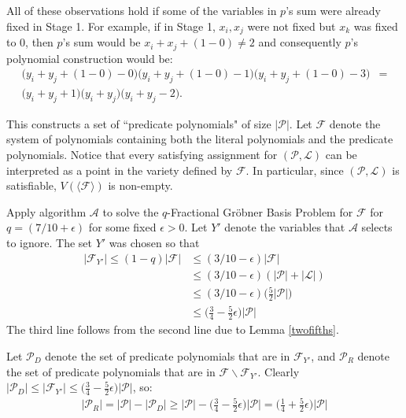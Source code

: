 \documentclass{article}
\begin{document}
All of these observations hold if some of the variables in $p$'s sum were already fixed in Stage 1. For example, if in Stage 1, $x_i, x_j$ were not fixed but $x_k$ was fixed to 0, then $p$'s sum would be $x_i+x_j+(1-0)\neq 2$ and consequently $p$'s polynomial construction would be: 
\begin{align*}
\Big(y_i+y_j+(1-0)-0\Big)\Big(y_i+y_j+(1-0)-1\Big)\Big(y_i+y_j+(1-0)-3\Big)&=\\
\Big(y_i+y_j+1\Big)\Big(y_i+y_j\Big)\Big(y_i+y_j-2\Big).
\end{align*}

This constructs a set of ``predicate polynomials" of size $|\mathcal{P}|$. Let $\mathcal{F}$ denote the system of polynomials containing both the literal polynomials and the predicate polynomials. Notice that every satisfying assignment for $(\mathcal{P},\mathcal{L})$ can be interpreted as a point in the variety defined by $\mathcal{F}$. In particular, since $(\mathcal{P},\mathcal{L})$ is satisfiable, $V(\langle \mathcal F \rangle)$ is non-empty.

Apply algorithm $\mathcal{A}$ to solve the $q$-Fractional Gr\"{o}bner Basis Problem for $\mathcal{F}$ for $q=(7/10+\epsilon)$ for some fixed $\epsilon>0$. Let $Y'$ denote the variables that $\mathcal{A}$ selects to ignore. The set $Y'$ was chosen so that
\begin{align*}
|\mathcal{F}_{Y'}|\leq (1-q)|\mathcal{F}|&\leq (3/10-\epsilon)|\mathcal{F}|\\
&\leq (3/10-\epsilon)(|\mathcal{P}|+|\mathcal{L}|)\\
&\leq (3/10-\epsilon)\Big(\frac{5}{2}|\mathcal{P}|\Big)\\
&\leq \Big(\frac{3}{4}-\frac{5}{2}\epsilon\Big)|\mathcal{P}|
\end{align*}
The third line follows from the second line due to Lemma \ref{twofifths}. 

Let $\mathcal{P}_D$ denote the set of predicate polynomials that are in $\mathcal{F}_{Y'}$, and $\mathcal{P}_R$ denote the set of predicate polynomials that are in $\mathcal{F}\backslash\mathcal{F}_{Y'}$. Clearly $|\mathcal{P}_D|\leq |\mathcal{F}_{Y'}|\leq \Big(\frac{3}{4}-\frac{5}{2}\epsilon\Big)|\mathcal{P}|$, so:
\begin{align}\label{quarter}
|\mathcal{P}_R|= |\mathcal{P}|- |\mathcal{P}_D| \geq |\mathcal{P}|- \Big(\frac{3}{4}-\frac{5}{2}\epsilon\Big)|\mathcal{P}|= \Big(\frac{1}{4}+\frac{5}{2}\epsilon\Big)|\mathcal{P}|
\end{align}
\end{document}
